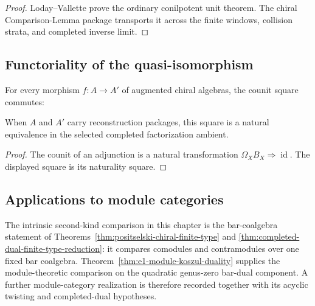\begin{proof}
Loday--Vallette \cite[Corollary~2.3.4]{LV12} prove the ordinary
conilpotent unit theorem.  The chiral Comparison-Lemma package
transports it across the finite windows, collision strata, and
completed inverse limit.
\end{proof}

\subsection{Functoriality of the quasi-isomorphism}

\begin{theorem}
\label{thm:bar-cobar-inversion-functorial}
For every morphism \(f\colon A\to A'\) of augmented chiral algebras,
the counit square commutes:
\begin{center}
\end{center}
When \(A\) and \(A'\) carry reconstruction packages, this square is
a natural equivalence in the selected completed factorization
ambient.
\end{theorem}

\begin{proof}
The counit of an adjunction is a natural transformation
\(\Omega_XB_X\Rightarrow\operatorname{id}\).  The displayed square is
its naturality square.
\end{proof}

\subsection{Applications to module categories}

\begin{remark}
\label{rem:derived-equiv-scope}
The intrinsic second-kind comparison in this chapter is the
bar-coalgebra statement of
Theorems~\ref{thm:positselski-chiral-finite-type} and
\ref{thm:completed-dual-finite-type-reduction}: it compares
comodules and contramodules over one fixed bar coalgebra.
Theorem~\ref{thm:e1-module-koszul-duality} supplies the
module-theoretic comparison on the quadratic genus-zero bar-dual
component.  A further module-category realization is therefore
recorded together with its acyclic twisting and completed-dual
hypotheses.
\end{remark}

